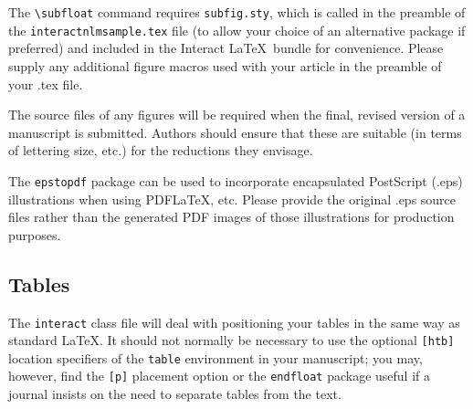 \documentclass[]{interact}
\theoremstyle{plain}%
\theoremstyle{definition}
\theoremstyle{remark}
\begin{document}
The \verb"\subfloat" command requires \verb"subfig.sty", which is called in the preamble of the \texttt{interactnlmsample.tex} file (to allow your choice of an alternative package if preferred) and included in the \textsf{Interact} \LaTeX\ bundle for convenience. Please supply any additional figure macros used with your article in the preamble of your .tex file.

The source files of any figures will be required when the final, revised version of a manuscript is submitted. Authors should ensure that these are suitable (in terms of lettering size, etc.) for the reductions they envisage.

The \texttt{epstopdf} package can be used to incorporate encapsulated PostScript (.eps) illustrations when using PDF\LaTeX, etc. Please provide the original .eps source files rather than the generated PDF images of those illustrations for production purposes.


\subsection{Tables}

The \texttt{interact} class file will deal with positioning your tables in the same way as standard \LaTeX. It should not normally be necessary to use the optional \texttt{[htb]} location specifiers of the \texttt{table} environment in your manuscript; you may, however, find the \verb"[p]" placement option or the \verb"endfloat" package useful if a journal insists on the need to separate tables from the text.
\end{document}
